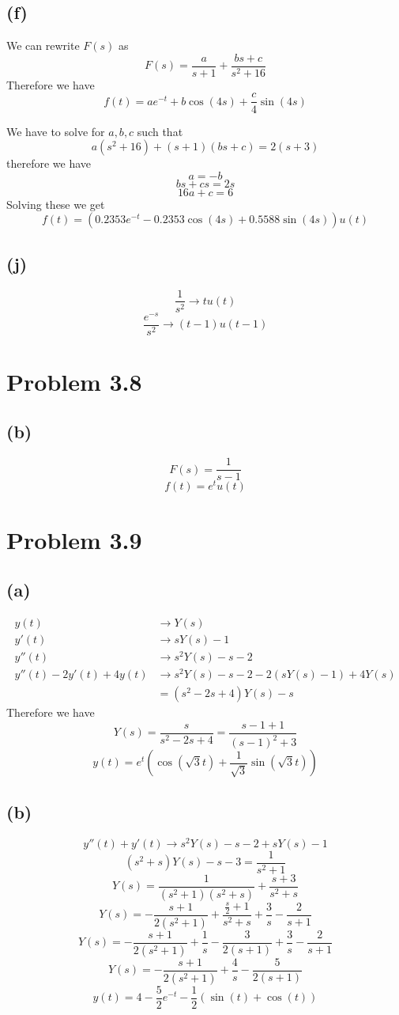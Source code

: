 \documentclass[12pt]{article}
\begin{document}
\subsection*{(f)}
We can rewrite $F(s)$ as
$$F(s)=\frac{a}{s+1}+\frac{bs+c}{s^2+16}$$
Therefore we have
$$f(t)=ae^{-t}+b\cos(4s)+\frac{c}{4}\sin(4s)$$


We have to solve for $a,b,c$ such that
$$a(s^2+16)+(s+1)(bs+c)=2(s+3)$$
therefore we have
$$a=-b$$
$$bs+cs=2s$$
$$16a+c=6$$
Solving these we get
$$f(t)=\boxed{\left(0.2353e^{-t}-0.2353\cos(4s)+0.5588\sin(4s)\right)u(t)}$$

\subsection*{(j)}
$$\frac{1}{s^2}\to tu(t)$$
$$\frac{e^{-s}}{s^2}\to \boxed{(t-1)u(t-1)}$$

\section*{Problem 3.8}
\subsection*{(b)}
$$F(s)=\frac{1}{s-1}$$
$$f(t)=\boxed{e^{t}u(t)}$$
\section*{Problem 3.9}
\subsection*{(a)}
\begin{align*}
y(t)&\to Y(s)\\
y'(t)&\to sY(s)-1\\
y''(t)&\to s^2Y(s)-s-2\\
y''(t)-2y'(t)+4y(t)&\to s^2Y(s)-s-2-2(sY(s)-1)+4Y(s)\\
&=(s^2-2s+4)Y(s)-s
\end{align*}
Therefore we have
$$Y(s)=\frac{s}{s^2-2s+4}=\frac{s-1+1}{(s-1)^2+3}$$
$$y(t)=\boxed{e^t (\cos(\sqrt{3}t)+\frac{1}{\sqrt{3}}\sin(\sqrt{3}t))}$$

\subsection*{(b)}
$$y''(t)+y'(t)\to s^2Y(s)-s-2+sY(s)-1$$
$$(s^2+s)Y(s)-s-3=\frac{1}{s^2+1}$$
$$Y(s)=\frac{1}{(s^2+1)(s^2+s)}+\frac{s+3}{s^2+s}$$
$$Y(s)=-\frac{s+1}{2(s^2+1)}+\frac{\frac{s}{2}+1}{s^2+s}+\frac{3}{s}-\frac{2}{s+1}$$
$$Y(s)=-\frac{s+1}{2(s^2+1)}+\frac{1}{s}-\frac{3}{2(s+1)}+\frac{3}{s}-\frac{2}{s+1}$$
$$Y(s)=-\frac{s+1}{2(s^2+1)}+\frac{4}{s}-\frac{5}{2(s+1)}$$
$$y(t)=\boxed{4-\frac{5}{2}e^{-t}-\frac{1}{2}(\sin(t)+\cos(t))}$$
\end{document}
